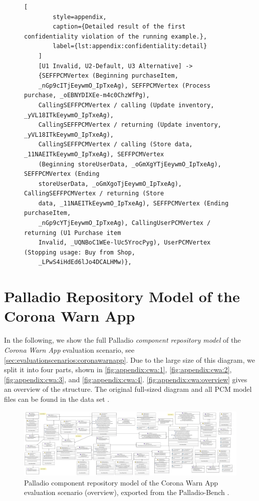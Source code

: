 \begin{figure}
    \begin{lstlisting}[
        style=appendix,
        caption={Detailed result of the first confidentiality violation of the running example.},
        label={lst:appendix:confidentiality:detail}
    ]
    [U1 Invalid, U2-Default, U3 Alternative] -> 
    {SEFFPCMVertex (Beginning purchaseItem,
    _nGp9cITjEeywmO_IpTxeAg), SEFFPCMVertex (Process purchase, _oEBNYDIXEe-m4c0ChzWfPg),
    CallingSEFFPCMVertex / calling (Update inventory, _yVL18ITkEeywmO_IpTxeAg), 
    CallingSEFFPCMVertex / returning (Update inventory, _yVL18ITkEeywmO_IpTxeAg),
    CallingSEFFPCMVertex / calling (Store data, _11NAEITkEeywmO_IpTxeAg), SEFFPCMVertex 
    (Beginning storeUserData, _oGmXgYTjEeywmO_IpTxeAg), SEFFPCMVertex (Ending 
    storeUserData, _oGmXgoTjEeywmO_IpTxeAg), CallingSEFFPCMVertex / returning (Store 
    data, _11NAEITkEeywmO_IpTxeAg), SEFFPCMVertex (Ending purchaseItem, 
    _nGp9cYTjEeywmO_IpTxeAg), CallingUserPCMVertex / returning (U1 Purchase item 
    Invalid, _UQNBoC1WEe-lUc5YrocPyg), UserPCMVertex (Stopping usage: Buy from Shop, 
    _LPwS4iHdEd6lJo4DCALHMw)},
    \end{lstlisting}
\end{figure}





\chapter{Palladio Repository Model of the Corona Warn App}%
\label{sec:appendix:cwa}

In the following, we show the full Palladio \emph{component repository model} of the \emph{Corona Warn App} evaluation scenario, see \autoref{sec:evaluationscenarios:coronawarnapp}.
Due to the large size of this diagram, we split it into four parts, shown in \autoref{fig:appendix:cwa:1}, \autoref{fig:appendix:cwa:2}, \autoref{fig:appendix:cwa:3}, and \autoref{fig:appendix:cwa:4}.
\autoref{fig:appendix:cwa:overview} gives an overview of the structure.
The original full-sized diagram and all \ac{PCM} model files can be found in the data set \cite{dataset}.

\begin{figure}
    \centering
    \includegraphics[width=\textwidth]{figures/chapter12/cwa.pdf}
    \caption[Palladio component repository model of the Corona Warn App evaluation scenario (overview).]{Palladio component repository model of the Corona Warn App evaluation scenario (overview), exported from the Palladio-Bench \cite{reussner_palladio_2024}.}
    \label{fig:appendix:cwa:overview}
\end{figure}

